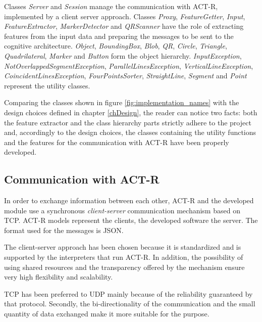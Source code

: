 		Classes \emph{Server} and \emph{Session} manage the communication with \mbox{ACT-R}, implemented by a client server approach.
		Classes \emph{Proxy}, \emph{FeatureGetter}, \emph{Input}, \emph{FeatureExtractor}, \emph{MarkerDetector} and \emph{QRScanner} have the role of extracting features from the input data and preparing the messages to be sent to the cognitive architecture.
		\emph{Object}, \emph{BoundingBox}, \emph{Blob}, \emph{QR}, \emph{Circle}, \emph{Triangle}, \emph{Quadrilateral}, \emph{Marker} and \emph{Button} form the object hierarchy.
		\emph{InputException}, \emph{NotOverlappedSegmentException}, \emph{ParallelLinesException}, \emph{VerticalLineException}, \emph{CoincidentLinesException}, \emph{FourPointsSorter}, \emph{StraightLine}, \emph{Segment} and \emph{Point} represent the utility classes.
	
		Comparing the classes shown in figure \ref{fig:implementation_names} with the design choices defined in chapter \ref{chDesign}, the reader can notice two facts: both the feature extractor and the class hierarchy parts strictly adhere to the project and, accordingly to the design choices, the classes containing the utility functions and the features for the communication with \mbox{ACT-R} have been properly developed.

	
		\subsection{Communication with ACT-R}
		In order to exchange information between each other, \mbox{ACT-R} and the developed module use a synchronous \emph{client-server} communication mechanism based on \mbox{TCP}. 
		\mbox{ACT-R} models represent the clients, the developed software the server. 
		The format used for the messages is \mbox{JSON}.  		

		The client-server approach has been chosen because it is standardized and is supported by the interpreters that run \mbox{ACT-R}. 
		In addition, the possibility of using shared resources and the transparency offered by the mechanism ensure very high flexibility and scalability.

		TCP has been preferred to \mbox{UDP} mainly because of the reliability guaranteed by that protocol. 
		Secondly, the bi-directionality of the communication and the small quantity of data exchanged make it more suitable for the purpose.

